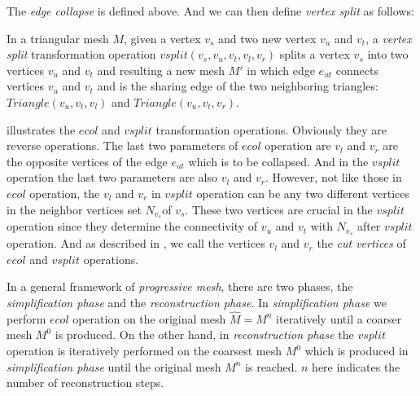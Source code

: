 The \emph{edge collapse} is defined above. And we can then define \emph{vertex split} as follows:
\begin{defn}
	In a triangular mesh $M$, given a vertex $v_s$ and two new vertex $v_u$ and $v_t$, a \emph{vertex split} transformation operation $vsplit(v_s,v_u,v_t,v_l,v_r)$ splits a vertex $v_s$ into two vertices $v_u$ and $v_t$ and resulting a new mesh $M'$ in which edge $e_{ut}$ connects vertices $v_u$ and $v_t$ and is the sharing edge of the two neighboring triangles: $Triangle(v_u,v_t,v_l)$ and $Triangle(v_u,v_t,v_r)$. 
\end{defn}

 illustrates the $ecol$ and $vsplit$ transformation operations. Obviously they are reverse operations. The last two parameters of $ecol$ operation are $v_l$ and $v_r$ are the opposite vertices of the edge $e_{ut}$ which is to be collapsed. And in the $vsplit$ operation the last two parameters are also $v_l$ and $v_r$. However, not like those in $ecol$ operation, the $v_l$ and $v_r$ in $vsplit$ operation can be any two different vertices in the neighbor vertices set $N_{v_s} $of $v_s$. These two vertices are crucial in the $vsplit$ operation since they determine the connectivity of $v_u$ and $v_t$ with $N_{v_s}$ after $vsplit$ operation. And as described in \cite{Kim:2003:TransitiveMeshSpace}, we call the vertices $v_l$ and $v_r$ the \emph{cut vertices} of $ecol$ and $vsplit$ operations.  



In a general framework of \emph{progressive mesh}, there are two phases, the \emph{simplification phase} and the \emph{reconstruction phase}. In \emph{simplification phase} we perform $ecol$ operation on the original mesh $\hat{M}=M^n$ iteratively until a coarser mesh $M^0$ is produced. On the other hand, in \emph{reconstruction phase} the $vsplit$ operation is iteratively performed on the coarsest mesh $M^0$ which is produced in \emph{simplification phase} until the original mesh $M^n$ is reached. $n$ here indicates the number of reconstruction steps. \\

